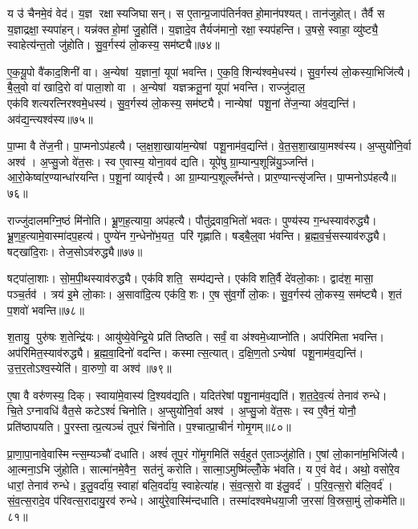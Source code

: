 य उ॑ चैनमे॒वं वेद॑।
य॒ज्ञ रक्षास्यजिघासन्।
स ए॒तान्प्र॒जाप॑तिर्नक्तहो॒मान॑पश्यत्।
तान॑जुहोत्।
तैर्वै स य॒ज्ञाद्रक्षा॒स्यपा॑हन्।
यन्न॑क्तहो॒मां जु॒होति॑।
य॒ज्ञादे॒व तैर्यज॑मानो॒ रक्षा॒स्यप॑हन्ति।
उ॒षसे॒ स्वाहा॒ व्यु॑ष्ट्यै॒ स्वाहेत्य॑न्त॒तो जु॑होति।
सु॒व॒र्गस्य॑ लो॒कस्य॒ सम॑ष्ट्यै॥७४॥\anuvakamend[वै नभासि॒ सूर्यो॒ ज्योति॒ सन्त॑त्यै॒ सम॑ष्ट्यै भू॒तं यज॑ते॒ नव॑ च]

ए॒क॒यू॒पो वै॑काद॒शिनी॑ वा।
अ॒न्येषां य॒ज्ञानां॒ यूपा॑ भवन्ति।
ए॒क॒वि॒शिन्य॑श्वमे॒धस्य॑।
सु॒व॒र्गस्य॑ लो॒कस्या॒भिजि॑त्यै।
बै॒ल्॒वो वा॑ खादि॒रो वा॑ पाला॒शो वा।
अ॒न्येषां यज्ञक्रतू॒नां यूपा॑ भवन्ति।
राज्जु॑दाल॒ एक॑विशत्यरत्निरश्वमे॒धस्य॑।
सु॒व॒र्गस्य॑ लो॒कस्य॒ सम॑ष्ट्यै।
नान्येषां पशू॒नां ते॑ज॒न्या अ॑व॒द्यन्ति॑।
अव॑द्य॒न्त्यश्व॑स्य॥७५॥

पा॒प्मा वै ते॑ज॒नी।
पा॒प्मनोऽप॑हत्यै।
प्ल॒क्ष॒शा॒खाया॑म॒न्येषां पशू॒नाम॑व॒द्यन्ति॑।
वे॒त॒स॒शा॒खाया॒मश्व॑स्य।
अ॒प्सुयो॑नि॒र्वा अश्व॑।
अ॒प्सु॒जो वे॑त॒सः।
स्व ए॒वास्य॒ योना॒वव॑ द्यति।
यूपे॑षु ग्रा॒म्यान्प॒शून्नि॑यु॒ञ्जन्ति॑।
आ॒रो॒केष्वा॑र॒ण्यान्धा॑रयन्ति।
प॒शू॒नां व्यावृ॑त्त्यै।
आ ग्रा॒म्यान्प॒शूल्लँभ॑न्ते।
प्रार॒ण्यान्त्सृ॑जन्ति।
पा॒प्मनोऽप॑हत्यै॥७६॥\anuvakamend[अश्व॑स्य॒ व्यावृ॑त्त्यै॒ त्रीणि॑ च]

राज्जु॑दालमग्नि॒ष्ठं मि॑नोति।
भ्रू॒ण॒ह॒त्याया॒ अप॑हत्यै।
पौतु॑द्रवाव॒भितो॑ भवतः।
पुण्य॑स्य ग॒न्धस्याव॑रुद्ध्यै।
भ्रू॒ण॒ह॒त्यामे॒वास्मा॑दप॒हत्य॑।
पुण्ये॑न ग॒न्धेनो॑भ॒यत॒ परि॑ गृह्णाति।
षड्बै॒ल्॒वा भ॑वन्ति।
ब्र॒ह्म॒व॒र्च॒सस्याव॑रुद्ध्यै।
षट्खा॑दि॒राः।
तेज॒सोऽव॑रुद्ध्यै॥७७॥

षट्पा॑ला॒शाः।
सो॒म॒पी॒थस्याव॑रुद्ध्यै।
एक॑विशति॒ सम्प॑द्यन्ते।
एक॑विशति॒र्वै दे॑वलो॒काः।
द्वाद॑श॒ मासा॒ पञ्च॒र्तव॑।
त्रय॑ इ॒मे लो॒काः।
अ॒सावा॑दि॒त्य एक॑वि॒शः।
ए॒ष सु॑व॒र्गो लो॒कः।
सु॒व॒र्गस्य॑ लो॒कस्य॒ सम॑ष्ट्यै।
श॒तं प॒शवो॑ भवन्ति॥७८॥

श॒तायु॒ पुरु॑षः श॒तेन्द्रि॑यः।
आयु॑ष्ये॒वेन्द्रि॒ये प्रति॑ तिष्ठति।
सर्वं॒ वा अ॑श्वमे॒ध्याप्नो॑ति।
अप॑रिमिता भवन्ति।
अप॑रिमित॒स्याव॑रुद्ध्यै।
ब्र॒ह्म॒वा॒दिनो॑ वदन्ति।
कस्मात्स॒त्यात्।
द॒क्षि॒ण॒तोऽन्येषां पशू॒नाम॑व॒द्यन्ति॑।
उ॒त्त॒र॒तोऽश्व॒स्येति॑।
वा॒रुणो॒ वा अश्व॑॥७९॥

ए॒षा वै वरु॑णस्य॒ दिक्।
स्वाया॑मे॒वास्य॑ दि॒श्यव॑द्यति।
यदित॑रेषां पशू॒नाम॑व॒द्यति॑।
श॒त॒दे॒व॒त्यं॑ तेनाव॑ रुन्धे।
चि॒तेऽग्नावधि॑ वैत॒से कटेऽश्वं॑ चिनोति।
अ॒प्सुयो॑नि॒र्वा अश्व॑।
अ॒प्सु॒जो वे॑त॒सः।
स्व ए॒वैनं॒ योनौ॒ प्रति॑ष्ठापयति।
पु॒रस्तात्प्र॒त्यञ्चं॑ तूप॒रं चि॑नोति।
प॒श्चात्प्रा॒चीनं॑ गोमृ॒गम्॥८०॥

प्रा॒णा॒पा॒नावे॒वास्मिन्त्स॒म्यञ्चौ॑ दधाति।
अश्वं॑ तूप॒रं गो॑मृ॒गमिति॑ सर्व॒हुत॑ ए॒ताञ्जु॑होति।
ए॒षां लो॒काना॑म॒भिजि॑त्यै।
आ॒त्मना॒ऽभि जु॑होति।
सात्मा॑नमे॒वैन॒ सत॑नुं करोति।
सात्मा॒ऽमुष्मि॑ल्लोँ॒के भ॑वति।
य ए॒वं वेद॑।
अथो॒ वसो॑रे॒व धारां॒ तेनाव॑ रुन्धे।
इ॒लु॒वर्दा॑य॒ स्वाहा॑ बलि॒वर्दा॑य॒ स्वाहेत्या॑ह।
सं॒व॒त्स॒रो वा इ॑लु॒वर्द॑।
प॒रि॒व॒त्स॒रो ब॑लि॒वर्द॑।
सं॒व॒त्स॒रादे॒व प॑रिवत्स॒रादायु॒रव॑ रुन्धे।
आयु॑रे॒वास्मि॑न्दधाति।
तस्मा॑दश्वमेधया॒जी ज॒रसा॑ वि॒स्रसा॒मुं लो॒कमे॑ति॥८१॥\anuvakamend[तेज॒सोऽव॑रुद्ध्यै भव॒न्त्यश्वो॑ गोमृ॒गमि॑लु॒वर्द॑श्च॒त्वारि॑ च]

